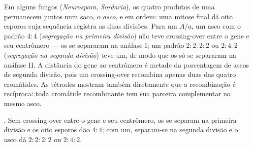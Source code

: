 \begin{proposition}\label{prop:b2:meiosis-heredity:tetrads}
Em alguns fungos (\emph{Neurospora}, \emph{Sordaria}), os quatro
produtos de uma  permanecem juntos num saco, o \emph{asco}, e em
ordem: uma mitose final dá oito esporos cuja sequência registra as
duas divisões. Para um  $A/a$, um asco com o padrão
$4 : 4$ (\emph{segregação na primeira divisão}) não teve crossing-over
entre o gene e seu centrômero --- os  se separaram na anáfase I;
um padrão $2 : 2 : 2 : 2$ ou $2 : 4 : 2$ (\emph{segregação na segunda
divisão}) teve um, de modo que os  só se separaram na anáfase
II. A distância do gene ao centrômero é metade da porcentagem de ascos
de segunda divisão, pois um crossing-over recombina apenas duas das
quatro cromátides. As tétrades mostram também diretamente que a
recombinação é recíproca: toda cromátide recombinante tem sua parceira
complementar no mesmo asco.
\end{proposition}

\begin{omfigure}

{\small {}. Sem crossing-over entre o gene e seu
centrômero, os  se separam na primeira divisão e os oito esporos
dão $4 : 4$; com um, separam-se na segunda divisão e o asco dá
$2 : 2 : 2 : 2$ ou $2 : 4 : 2$.}
\end{omfigure}

